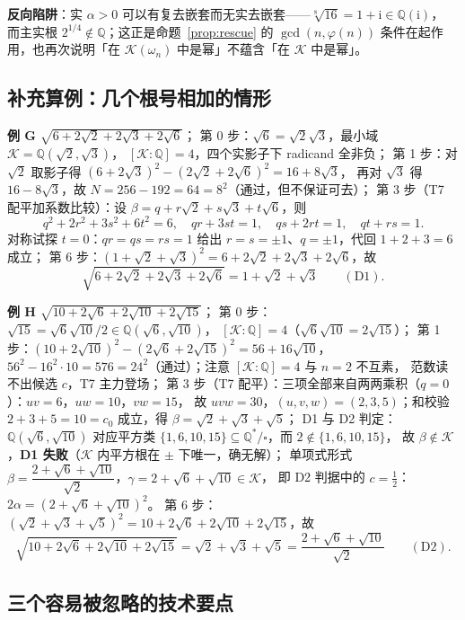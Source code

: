 \documentclass[UTF8,a4paper,11pt]{ctexart}
\newcommand{\ii}{\mathrm{i}}
\begin{document}
\textbf{反向陷阱}：实 $\alpha>0$ 可以有复去嵌套而无实去嵌套——$\sqrt[8]{16}=1+\ii\in\mathbb{Q}(\ii)$，
而主实根 $2^{1/4}\notin\mathbb{Q}$；这正是命题~\ref{prop:rescue} 的 $\gcd(n,\varphi(n))$
条件在起作用，也再次说明「在 $\mathscr{K}(\omega_n)$ 中是幂」不蕴含「在 $\mathscr{K}$ 中是幂」。
\subsection{补充算例：几个根号相加的情形}

\textbf{例 G} $\sqrt{6+2\sqrt2+2\sqrt3+2\sqrt6}$；
第 0 步：$\sqrt6=\sqrt2\sqrt3$，最小域 $\mathscr{K}=\mathbb{Q}(\sqrt2,\sqrt3)$，
$[\mathscr{K}:\mathbb{Q}]=4$，四个实影子下 radicand 全非负；
第 1 步：对 $\sqrt2$ 取影子得 $(6+2\sqrt3)^2-(2\sqrt2+2\sqrt6)^2=16+8\sqrt3$，
再对 $\sqrt3$ 得 $16-8\sqrt3$，故 $N=256-192=64=8^2$（通过，但不保证可去）；
第 3 步（T7 配平加系数比较）：设 $\beta=q+r\sqrt2+s\sqrt3+t\sqrt6$，则
\[
q^2+2r^2+3s^2+6t^2=6,\quad qr+3st=1,\quad qs+2rt=1,\quad qt+rs=1 .
\]
对称试探 $t=0$：$qr=qs=rs=1$ 给出 $r=s=\pm1$、$q=\pm1$，代回 $1+2+3=6$ 成立；
第 6 步：$(1+\sqrt2+\sqrt3)^2=6+2\sqrt2+2\sqrt3+2\sqrt6$，故
\[
\sqrt{6+2\sqrt2+2\sqrt3+2\sqrt6}=1+\sqrt2+\sqrt3\qquad(\text{D1}).
\]

\textbf{例 H} $\sqrt{10+2\sqrt6+2\sqrt{10}+2\sqrt{15}}$；
第 0 步：$\sqrt{15}=\sqrt6\sqrt{10}/2\in\mathbb{Q}(\sqrt6,\sqrt{10})$，
$[\mathscr{K}:\mathbb{Q}]=4$（$\sqrt6\sqrt{10}=2\sqrt{15}$）；
第 1 步：$(10+2\sqrt{10})^2-(2\sqrt6+2\sqrt{15})^2=56+16\sqrt{10}$，
$56^2-16^2\cdot10=576=24^2$（通过）；注意 $[\mathscr{K}:\mathbb{Q}]=4$ 与 $n=2$ 不互素，
范数读不出候选 $c$，T7 主力登场；
第 3 步（T7 配平）：三项全部来自两两乘积（$q=0$）：$uv=6$，$uw=10$，$vw=15$，
故 $uvw=30$，$(u,v,w)=(2,3,5)$；和校验 $2+3+5=10=c_0$ 成立，得
$\beta=\sqrt2+\sqrt3+\sqrt5$；
D1 与 D2 判定：$\mathbb{Q}(\sqrt6,\sqrt{10})$ 对应平方类
$\{1,6,10,15\}\subseteq\mathbb{Q}^*/{\square}$，而 $2\notin\{1,6,10,15\}$，
故 $\beta\notin\mathscr{K}$，\textbf{D1 失败}（$\mathscr{K}$ 内平方根在 $\pm$ 下唯一，确无解）；
单项式形式 $\beta=\dfrac{2+\sqrt6+\sqrt{10}}{\sqrt2}$，$\gamma=2+\sqrt6+\sqrt{10}\in\mathscr{K}$，
即 D2 判据中的 $c=\tfrac12$：$2\alpha=(2+\sqrt6+\sqrt{10})^2$。
第 6 步：$(\sqrt2+\sqrt3+\sqrt5)^2=10+2\sqrt6+2\sqrt{10}+2\sqrt{15}$，故
\[
\sqrt{10+2\sqrt6+2\sqrt{10}+2\sqrt{15}}=\sqrt2+\sqrt3+\sqrt5
=\frac{2+\sqrt6+\sqrt{10}}{\sqrt2}\qquad(\text{D2}).
\]

\subsection{三个容易被忽略的技术要点}
\label{sec:closing}
\end{document}
